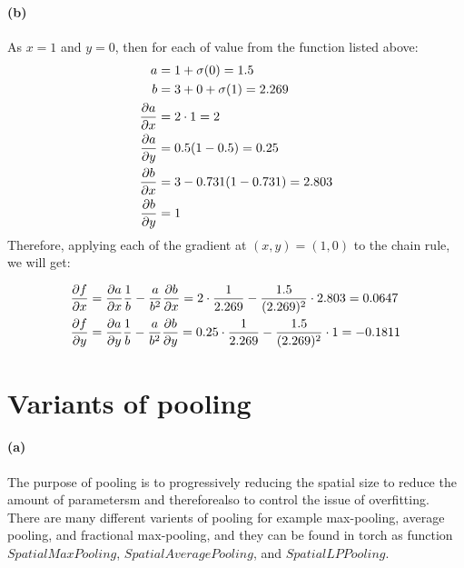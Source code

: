 \documentclass{article}
\begin{document}
\paragraph{(b)} As $x = 1$ and $y = 0$, then for each of value from the function listed above:
\begin{equation}
\begin{aligned}
a &= 1+ \sigma(0) = 1.5 \\
b &= 3+ 0+ \sigma(1) = 2.269 \\
{\partial a \over \partial x} &= 2\cdot 1 = 2 \\
{\partial a \over \partial y} &= 0.5(1-0.5) = 0.25 \\
{\partial b \over \partial x} &= 3-0.731(1-0.731) = 2.803\\
{\partial b \over \partial y} &= 1 \\
\end{aligned}
\end{equation}
Therefore, applying each of the gradient at $(x,y) = (1,0)$ to the chain rule, we will get:

\begin{equation}
\begin{aligned}
{\partial f \over \partial x} &= {\partial a \over \partial x}{1\over b} - {a\over b^2}{\partial b \over \partial x} = 2\cdot{1\over2.269} - {1.5\over(2.269)^2}\cdot2.803 = 0.0647 \\
{\partial f \over \partial y} &= {\partial a \over \partial y}{1\over b} - {a\over b^2}{\partial b \over \partial y} =  0.25\cdot{1\over2.269} - {1.5 \over(2.269)^2}\cdot 1 =  -0.1811\\
\end{aligned}
\end{equation}

\section{Variants of pooling}
\paragraph{(a)} The purpose of pooling is to progressively reducing the spatial size to reduce the amount of parametersm and thereforealso to control the issue of overfitting. There are many different varients of pooling for example max-pooling, average pooling, and fractional max-pooling, and they can be found in torch as function $SpatialMaxPooling$, $SpatialAveragePooling$, and $SpatialLPPooling$.\\
\end{document}
